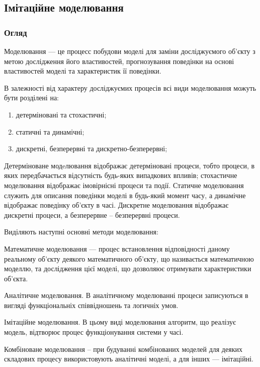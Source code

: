 \subsection{Імітаційне моделювання}
\subsubsection{Огляд}
Моделювання --- це процесс побудови моделі для заміни досліджуємого об’єкту з метою дослідження його властивостей, прогнозування поведінки на основі властивостей моделі та характеристик її поведінки\cite{model}.

В залежності від характеру досліджуємих процесів всі види моделювання можуть бути розділені на:
\begin{enumerate}
\item детерміновані та стохастичні;
\item статичні та динамічні;
\item дискретні, безперервні та дискретно-безперервні;
\end{enumerate}
 
Детерміноване модeлювання відображає детерміновані процеси, тобто процеси, в яких передбачається відсутність будь-яких випадкових впливів; стохастичне моделювання відображає імовірнісні процеси та події. Статичне моделювання служить для описання поведінки моделі в будь-який момент часу, а динамічне відображає поведінку об’єкту в часі. Дискретне моделювання відображає дискретні процеси, а безперервне -- безперервні процеси\cite{model}.

Виділяють наступні основні методи моделювання\cite{model}:
\begin{longEnumerate}
   \item Математичне моделювання --- процес встановлення відповідності даному реальному об’єкту деякого математичного об’єкту, що називається математичною моделлю, та дослідження цієї моделі, що дозволяює отримувати характеристики об’єкта. 
   \item Аналітичне моделювання. В аналітичному моделюванні процеси записуються в вигляді функціональніх співвідношень та логичніх умов.
   \item Імітаційне моделювання. В цьому виді моделювання алгоритм, що реалізує модель, відтворює процес функціонування системи у часі.
   \item Комбіноване моделювання -- при будуванні комбінованих моделей для деяких складових процесу використовують аналітичні моделі, а для інших --- імітаційні.
\end{longEnumerate}

